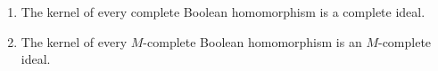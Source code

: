 \begin{enumerate}
\item The kernel of every complete Boolean homomorphism is a complete ideal.
\item The kernel of every $M$-complete Boolean homomorphism is an $M$-complete ideal.
\end{enumerate}
